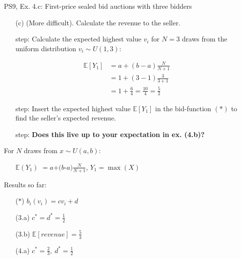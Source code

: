 \begin{frame}{PS9, Ex. 4.c: First-price sealed bid auctions with three bidders}
    \begin{itemize}
      \item[(c)] (More difficult). Calculate the revenue to the seller.
    \end{itemize}
    \vspace{-10pt}
    \begin{multicols}{2}
      \begin{itemize}
        \item[\nth{1} step:] Calculate the expected highest value $v_i$ for $N=3$ draws from the uniform distribution $v_i\sim U(1,3)$:
      \end{itemize}
      \vspace{-8pt}
      \begin{align*}
        \mathbb{E}[Y_1]&=a+(b-a)\frac{N}{N+1}\\
                       &=1+(3-1)\frac{3}{3+1}\\
                       &=1+\frac{6}{4}=\frac{10}{4}=\frac{5}{2}
      \end{align*}
      \vspace{-12pt}
      \begin{itemize}
        \item[\nth{2} step:] Insert the expected highest value $\mathbb{E}[Y_1]$ in the bid-function $(*)$  to find the seller's expected revenue.
        \item[\nth{3} step:] \textbf{Does this live up to your expectation in ex. (4.b)?}
      \end{itemize}
      \vfill\null\columnbreak
      For $N$ draws from $x\sim U(a, b):$
      \vspace{-6pt}
      \begin{enumerate}
        \item[$\mathbb{E}(Y_1)$] $=a$+$(b$-$a)\frac{N}{N+1}$, $Y_1=\max(X)$
      \end{enumerate}
      \vspace{-6pt}
      Results so far:
      \vspace{-6pt}
      \begin{itemize}
        \item[($*$)] $b_i(v_i) = cv_i+d$
        \item[(3.a)] $c^*=d^*=\frac{1}{2}$
        \item[(3.b)] $\mathbb{E}[revenue]=\frac{5}{3}$
        \item[(4.a)] $c^*=\frac{2}{3},\ d^*=\frac{1}{2}$

\end{itemize}
\end{multicols}
\end{frame}
